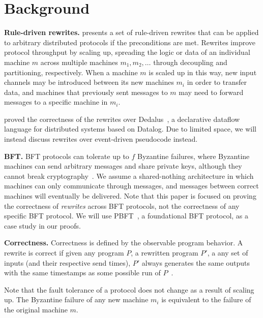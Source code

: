 \section{Background}
\label{sec:background}
\textbf{Rule-driven rewrites.}
\sigmodpaper{} presents a set of rule-driven rewrites that can be applied to arbitrary distributed protocols if the preconditions are met.
Rewrites improve protocol throughput by scaling up, spreading the logic or data of an individual machine $m$ across multiple machines $m_1, m_2, \ldots$ through decoupling and partitioning, respectively.
When a machine $m$ is scaled up in this way, new input channels may be introduced between its new machines $m_i$ in order to transfer data, and machines that previously sent messages to $m$ may need to forward messages to a specific machine in $m_i$.

\sigmodpaper{} proved the correctness of the rewrites over Dedalus~\cite{dedalus}, a declarative dataflow language for distributed systems based on Datalog.
Due to limited space, we will instead discuss rewrites over event-driven pseudocode instead.

\textbf{BFT.}
BFT protocols can tolerate up to $f$ Byzantine failures, where Byzantine machines can send arbitrary messages and share private keys, although they cannot break cryptography~\cite{pbft}.
We assume a shared-nothing architecture in which machines can only communicate through messages, and messages between correct machines will eventually be delivered.
Note that this paper is focused on proving the correctness of \emph{rewrites} across BFT protocols, not the correctness of any specific BFT protocol.
We will use PBFT~\cite{pbft}, a foundational BFT protocol, as a case study in our proofs.

\textbf{Correctness.}
Correctness is defined by the observable program behavior.
A rewrite is correct if given any program $P$, a rewritten program $P'$, a any set of inputs (and their respective send times), $P'$ always generates the same outputs with the same timestamps as some possible run of $P$~\cite{autocomp}.

Note that the fault tolerance of a protocol does not change as a result of scaling up.
The Byzantine failure of any new machine $m_i$ is equivalent to the failure of the original machine $m$.
